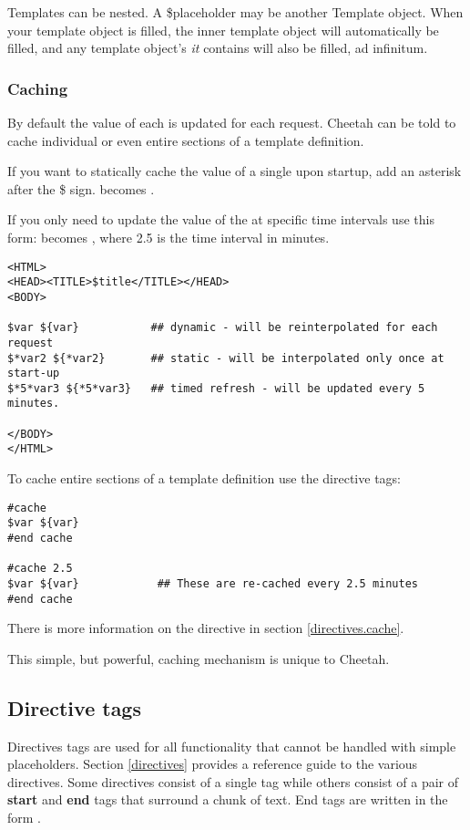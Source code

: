 Templates can be nested.  A \$placeholder may be another Template object.  When
your template object is filled, the inner template object will automatically be
filled, and any template object's {\em it} contains will also be filled, ad
infinitum.

\subsubsection{Caching}
\label{TDL.placeholders.caching}

By default the value of each  is updated for each request.
Cheetah can be told to cache individual  or even entire
sections of a template definition.
                         
If you want to statically cache the value of a single  upon
startup, add an asterisk after the \$ sign.   becomes .

If you only need to update the value of the  at specific
time intervals use this form:  becomes  ,
where 2.5 is the time interval in minutes.  

\begin{verbatim}
<HTML>
<HEAD><TITLE>$title</TITLE></HEAD>
<BODY>

$var ${var}           ## dynamic - will be reinterpolated for each request
$*var2 ${*var2}       ## static - will be interpolated only once at start-up
$*5*var3 ${*5*var3}   ## timed refresh - will be updated every 5 minutes.

</BODY>
</HTML>
\end{verbatim}

To cache entire sections of a template definition use the  directive tags:
\begin{verbatim}
#cache
$var ${var}
#end cache 

#cache 2.5
$var ${var}            ## These are re-cached every 2.5 minutes
#end cache 
\end{verbatim}

There is more information on the  directive in section
\ref{directives.cache}.

This simple, but powerful, caching mechanism is unique to Cheetah.

\subsection{Directive tags}
\label{TDL.directives}
Directives tags are used for all functionality that cannot be handled with
simple placeholders. Section \ref{directives} provides a reference guide to the
various directives.  Some directives consist of a single tag while others
consist of a pair of {\bf start} and {\bf end} tags that surround a chunk of
text.  End tags are written in the form .

